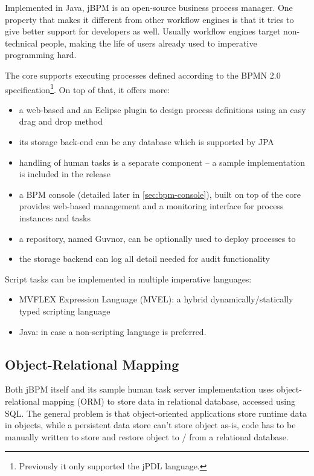 
Implemented in Java, jBPM \cite{jbpm} is an open-source business process
manager. One property that makes it different from other workflow engines is
that it tries to give better support for developers as well. Usually workflow
engines target non-technical people, making the life of users already used to
imperative programming hard.

The core supports executing processes defined according to the BPMN 2.0
specification\footnote{Previously it only supported the jPDL language.}. On top of that, it offers more:

\begin{itemize}
\item a web-based and an Eclipse plugin to design process definitions using an easy drag and drop method
\item its storage back-end can be any database which is supported by JPA\cite{jpa}
\item handling of human tasks is a separate component -- a sample implementation is included in the release
\item a BPM console (detailed later in \autoref{sec:bpm-console}), built
on top of the core provides web-based management and a monitoring interface for
process instances and tasks
\item a repository, named Guvnor, can be optionally used to deploy processes to
\item the storage backend can log all detail needed for audit functionality
\end{itemize}

Script tasks can be implemented in multiple imperative languages:

\begin{itemize}
\item MVFLEX Expression Language (MVEL): a hybrid dynamically/statically typed scripting language
\item Java: in case a non-scripting language is preferred.
\end{itemize}

\subsection{Object-Relational Mapping}

Both jBPM itself and its sample human task server implementation uses
object-relational mapping (ORM) to store data in relational database, accessed
using SQL. The general problem is that object-oriented applications store
runtime data in objects, while a persistent data store can't store object
as-is, code has to be manually written to store and restore object to / from a
relational database.

